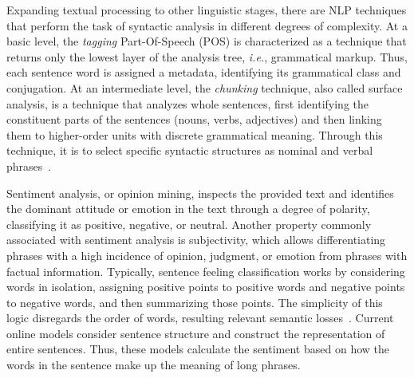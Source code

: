 \documentclass{ieeeaccess}
\begin{document}
Expanding textual processing to other linguistic stages, there are NLP techniques that perform the task of syntactic analysis in different degrees of complexity. At a basic level, the \textit{tagging} Part-Of-Speech (POS) is characterized as a technique that returns only the lowest layer of the analysis tree, \textit{i.e.}, grammatical markup. Thus, each sentence word is assigned a metadata, identifying its grammatical class and conjugation. At an intermediate level, the \textit{chunking} technique, also called surface analysis, is a technique that analyzes whole sentences, first identifying the constituent parts of the sentences (nouns, verbs, adjectives) and then linking them to higher-order units with discrete grammatical meaning. Through this technique, it is to select specific syntactic structures as nominal and verbal phrases~\cite{manning2014stanford}. 
 


Sentiment analysis, or opinion mining, inspects the provided text  and identifies the dominant attitude or emotion in the text through a degree of polarity, classifying it as positive, negative, or neutral. Another property commonly associated with sentiment analysis is subjectivity, which allows differentiating phrases with a high incidence of opinion, judgment, or emotion from phrases with factual information. Typically, sentence feeling classification works by considering words in isolation, assigning positive points to positive words and negative points to negative words, and then summarizing those points. The simplicity of this logic disregards the order of words, resulting relevant semantic losses~\cite{socher2013recursive}. Current online models consider sentence structure and construct the representation of entire sentences. Thus, these models calculate the sentiment based on how the words in the sentence make up the meaning of long phrases.
\end{document}
